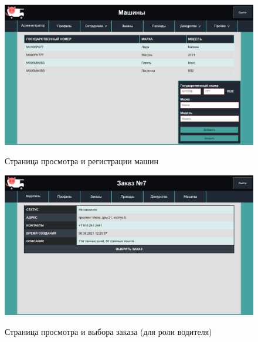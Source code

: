 \begin{figure}[h!] 
	\begin{center}
		{\includegraphics[scale=0.43, angle=0]{sc/trucks}}
		\caption{Страница просмотра и регистрации машин}
		\label{trucks_sc}
	\end{center}
\end{figure}

\begin{figure}[h!] 
	\begin{center}
		{\includegraphics[scale=0.4, angle=0]{sc/pick_delivery}}
		\caption{Страница просмотра и выбора заказа (для роли водителя)}
		\label{pick_delivery_sc}
	\end{center}
\end{figure}

